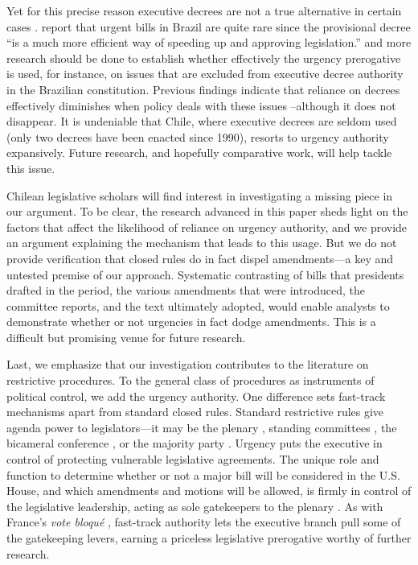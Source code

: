 \documentclass[letter,12pt]{article}
\begin{document}
Yet for this precise reason executive decrees are not a true alternative in certain cases \citep{palanza.2019}. \citet[][:164]{figueiredo.limongi.2000} report that urgent bills in Brazil are quite rare since the provisional decree ``is a much more efficient way of speeding up and approving legislation.'' and more research should be done to establish whether effectively the urgency prerogative is used, for instance, on issues that are excluded from executive decree authority in the Brazilian constitution. Previous findings indicate that reliance on decrees effectively diminishes when policy deals with these issues --although it does not disappear. It is undeniable that Chile, where executive decrees are seldom used (only two decrees have been enacted since 1990), resorts to urgency authority expansively. Future research, and hopefully comparative work, will help tackle this issue. 

Chilean legislative scholars will find interest in investigating a missing piece in our argument. To be clear, the research advanced in this paper sheds light on the factors that affect the likelihood of reliance on urgency authority, and we provide an argument explaining the mechanism that leads to this usage. But we do not provide verification that closed rules do in fact dispel amendments---a key and untested premise of our approach. Systematic contrasting of bills that presidents drafted in the period, the various amendments that were introduced, the committee reports, and the text ultimately adopted, would enable analysts to demonstrate whether or not urgencies in fact dodge amendments. This is a difficult but promising venue for future research. 

Last, we emphasize that our investigation contributes to the literature on restrictive procedures. To the general class of procedures as instruments of political control, we add the urgency authority. One difference sets fast-track mechanisms apart from standard closed rules. Standard restrictive rules give agenda power to legislators---it may be the plenary \citep{mcnollgast.1987}, standing committees \citep{weingast.1992}, the bicameral conference \citep{shepsle.weingast.1987}, or the majority party \citep{cox.mccubbins.1997}. Urgency puts the executive in control of protecting vulnerable legislative agreements. The unique role and function to determine whether or not a major bill will be considered in the U.S. House, and which amendments and motions will be allowed, is firmly in control of the legislative leadership, acting as sole gatekeepers to the plenary \citep{cox.2006}. As with France's \emph{vote bloqué} \citep{huber.1996b}, fast-track authority lets the executive branch pull some of the gatekeeping levers, earning a priceless legislative prerogative worthy of further research.
\end{document}
